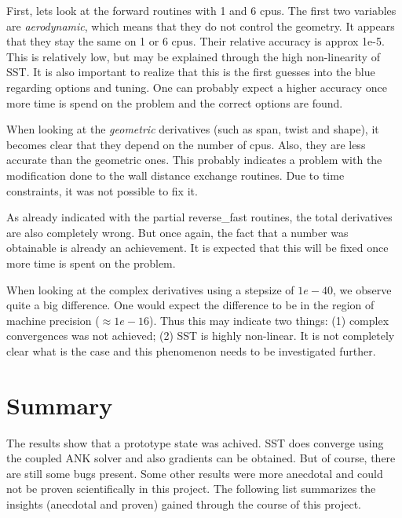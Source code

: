 \noindent First, lets look at the forward routines with 1 and 6 cpus. The first
two variables are \textit{aerodynamic}, which means that they do not control
the geometry. It appears that they stay the same on 1 or 6 cpus. Their relative
accuracy is approx 1e-5. This is relatively low, but may be explained through
the high non-linearity of SST. It is also important to realize that this is
the first guesses into the blue regarding options and tuning. One can probably
expect a higher accuracy once more time is spend on the problem and the correct
options are found.

When looking at the \textit{geometric} derivatives (such as span, twist and
shape), it becomes clear that they depend on the number of cpus. Also, they are
less accurate than the geometric ones. This probably indicates a problem with
the modification done to the wall distance exchange routines. Due to time
constraints, it was not possible to fix it.

As already indicated with the partial reverse\_fast routines, the total
derivatives are also completely wrong. But once again, the fact that a number
was obtainable is already an achievement. It is expected that this will be
fixed once more time is spent on the problem.

When looking at the complex derivatives using a stepsize of $1e-40$, we observe
quite a big difference. One would expect the difference to be in the region of
machine precision ($\approx 1e-16$). Thus this may indicate two things: (1)
complex convergences was not achieved; (2) SST is highly non-linear. It is not
completely clear what is the case and this phenomenon needs to be investigated
further.







\section{Summary}
The results show that a prototype state was achived. SST does converge using
the coupled ANK solver and also gradients can be obtained. But of course, there
are still some bugs present. Some other results were more anecdotal and could
not be proven scientifically in this project. The following list summarizes the
insights (anecdotal and proven) gained through the course of this project.

